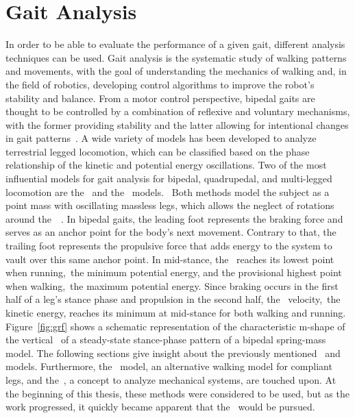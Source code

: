 \section{Gait Analysis}

In order to be able to evaluate the performance of a given gait, different analysis techniques can be used. Gait analysis is the systematic study of walking patterns and movements, with the goal of understanding the mechanics of walking and, in the field of robotics, developing control algorithms to improve the robot's stability and balance. From a motor control perspective, bipedal gaits are thought to be controlled by a combination of reflexive and voluntary mechanisms, with the former providing stability and the latter allowing for intentional changes in gait patterns~\cite{Grillner1975}. A wide variety of models has been developed to analyze terrestrial legged locomotion, which can be classified based on the phase relationship of the kinetic and potential energy oscillations. Two of the most influential models for gait analysis for bipedal, quadrupedal, and multi-legged locomotion are the~ and the~ models.~\cite{Lee2018} Both methods model the subject as a point mass with oscillating massless legs, which allows the neglect of rotations around the~~\cite{Kajita1991}. In bipedal gaits, the leading foot represents the braking force and serves as an anchor point for the body's next movement. Contrary to that, the trailing foot represents the propulsive force that adds energy to the system to vault over this same anchor point. In mid-stance, the~ reaches its lowest point when running,~\ie the minimum potential energy, and the provisional highest point when walking,~\ie the maximum potential energy. Since braking occurs in the first half of a leg's stance phase and propulsion in the second half, the~ velocity,~\ie the kinetic energy, reaches its minimum at mid-stance for both walking and running.~\cite{Lee2018} Figure~\ref{fig:grf} shows a schematic representation of the characteristic m-shape of the vertical~ of a steady-state stance-phase pattern of a bipedal spring-mass model. The following sections give insight about the previously mentioned~ and~ models. Furthermore, the~ model, an alternative walking model for compliant legs, and the~, a concept to analyze mechanical systems, are touched upon. At the beginning of this thesis, these methods were considered to be used, but as the work progressed, it quickly became apparent that the~ would be pursued. 

